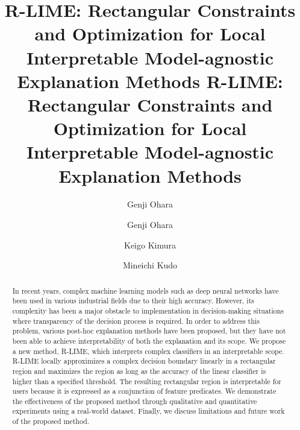\documentclass[11pt]{article}
\begin{document}
\ifnum{}
	\title{%
		R-LIME: Rectangular Constraints and Optimization for Local Interpretable
		Model-agnostic Explanation Methods
	}
	\etitle{}
	\author{Genji Ohara}
\else
	\title{%
		R-LIME: Rectangular Constraints and Optimization for Local Interpretable
		Model-agnostic Explanation Methods}

	\author{Genji Ohara \and
		Keigo Kimura \and
		Mineichi Kudo
	}


\fi

\maketitle              %

\ifnum{}
	\pagestyle{plain}
	\tableofcontents
	\newpage
	\listoffigures\listoftables\clearpage
	\pagestyle{plain}
\else

	\begin{abstract}
		In recent years,
		complex machine learning models such as deep neural networks
		have been used in various industrial fields due to their high accuracy.
		However,
		its complexity has been a major obstacle to implementation
		in decision-making situations where transparency of the decision process
		is required.
		In order to address this problem,
		various post-hoc explanation methods have been proposed,
		but they have not been able to achieve interpretability of
		both the explanation and its scope.
		We propose a new method, R-LIME,
		which interprets complex classifiers in an interpretable scope.
		R-LIME locally approximizes a complex decision boundary linearly
		in a rectangular region
		and maximizes the region as long as the accuracy of the linear
		classifier is higher than a specified threshold.
		The resulting rectangular region is interpretable for users because it is
		expressed as a conjunction of feature predicates.
		We demonstrate the effectiveness of the proposed method through qualitative
		and quantitative experiments using a real-world dataset.
		Finally, we discuss limitations and future work of the proposed method.
	\end{abstract}
\fi
\end{document}
